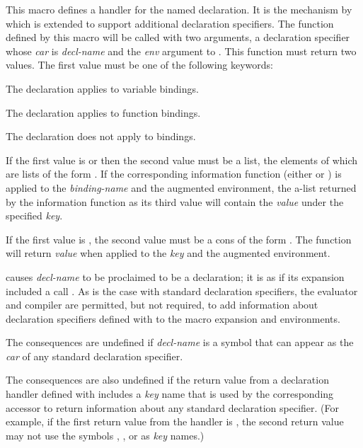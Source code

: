 \begin{newer}
\begin{defmac}
  This macro defines a handler for the named declaration.  It is the mechanism by which
   is extended to support additional declaration
  specifiers.  The function defined by this macro will be called with two
  arguments, a declaration specifier whose \emph{car} is \emph{decl-name}
  and the \emph{env} argument to
  .  This function must return two values.  The
  first value must be one of the following keywords:
\begin{indentdesc}{7pc}
\item[\cd{:variable}]     The declaration applies to variable bindings.
\item[\cd{:function}]     The declaration applies to function bindings.
\item[\cd{:declare}]      The declaration does not apply to bindings.
\end{indentdesc}
If the first value is  or 
then the second value must be a list, the elements of which are lists of the
  form .  If the corresponding information
  function (either  or ) is applied to
  the \emph{binding-name} and the augmented environment, the a-list returned
  by the information function as its third value will contain the \emph{value}
  under the specified \emph{key}.

  If the first value is , the second value must be a cons
  of the form .  The function
   will return \emph{value} when applied to the
  \emph{key} and the augmented environment.

   causes \emph{decl-name} to be proclaimed to be a
  declaration; it is as if its expansion included a call .  As is the case with standard
  declaration specifiers, the evaluator and compiler are permitted,
  but not required, to add information about declaration specifiers
  defined with  to the macro expansion and 
  environments.

  The consequences are undefined if \emph{decl-name} is a symbol that can
  appear as the \emph{car} of any standard declaration specifier.

  The consequences are also undefined if the return value from a 
  declaration handler defined with  includes a \emph{key} name
  that is used by the corresponding accessor to return information about
  any standard declaration specifier.  (For example, if
  the first return value from the handler is , the second return
  value may not use the symbols , , or 
  as \emph{key} names.)


\end{defmac}
\end{newer}
